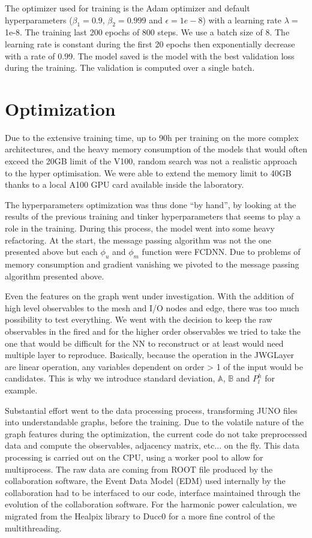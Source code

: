 \documentclass[../main.tex]{subfiles}
\begin{document}
The optimizer used for training is the Adam optimizer and default hyperparameters ($\beta_1= 0.9$, $\beta_2 = 0.999$ and $\epsilon = 1e-8$) with a learning rate $\lambda = $ 1e-8. The training last 200 epochs of 800 steps. We use a batch size of 8. The learning rate is constant during the first 20 epochs then exponentially decrease with a rate of 0.99. The model saved is the model with the best validation loss during the training. The validation is computed over a single batch.

\section{Optimization}

Due to the extensive training time, up to 90h per training on the more complex architectures, and the heavy memory consumption of the models that would often exceed the 20GB limit of the V100, random search was not a realistic approach to the hyper optimisation. We were able to extend the memory limit to 40GB thanks to a local A100 GPU card available inside the laboratory.

The hyperparameters optimization was thus done ``by hand'', by looking at the results of the previous training and tinker hyperparameters that seems to play a role in the training. During this process, the model went into some heavy refactoring. At the start, the message passing algorithm was not the one presented above but each $\phi_u$ and $\phi_m$ function were FCDNN. Due to problems of memory consumption and gradient vanishing we pivoted to the message passing algorithm presented above.

Even the features on the graph went under investigation. With the addition of high level observables to the {\color{Dandelion} mesh} and {\color{blue} I/O} nodes and edge, there was too much possibility to test everything. We went with the decision to keep the raw observables in the {\color{red} fired} and for the higher order observables we tried to take the one that would be difficult for the NN to reconstruct or at least would need multiple layer to reproduce. Basically, because the operation in the JWGLayer are linear operation, any variables dependent on order  > 1 of the input would be candidates. This is why we introduce standard deviation, $\mathbb{A}$, $\mathbb{B}$ and $P^h_l$ for example.

Substantial effort went to the data processing process, transforming JUNO files into understandable graphs, before the training. Due to the volatile nature of the graph features during the optimization, the current code do not take preprocessed data and compute the observables, adjacency matrix, etc... on the fly. This data processing is carried out on the CPU, using a worker pool to allow for multiprocess. The raw data are coming from ROOT file produced by the collaboration software, the Event Data Model (EDM) used internally by the collaboration \cite{li_design_2017} had to be interfaced to our code, interface maintained through the evolution of the collaboration software. For the harmonic power calculation, we migrated from the Healpix library to Ducc0 \cite{reinecke_ducc0_2024} for a more fine control of the multithreading.
\end{document}
